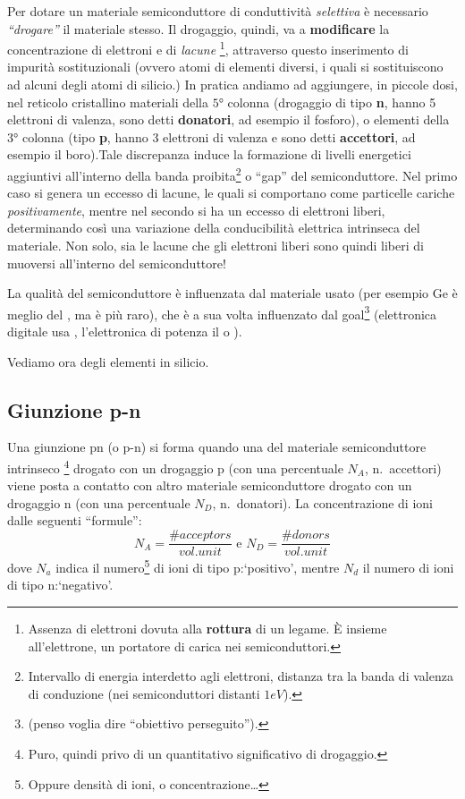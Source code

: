 \documentclass[
]{book}
\begin{document}
Per dotare un materiale semiconduttore di conduttività \emph{selettiva}
è necessario \emph{``drogare''} il materiale stesso. Il drogaggio,
quindi, va a \textbf{modificare} la concentrazione di elettroni e di
\emph{lacune} \footnote{Assenza di elettroni dovuta alla
  \textbf{rottura} di un legame. È insieme all'elettrone, un portatore
  di carica nei semiconduttori.}, attraverso questo inserimento di
impurità sostituzionali (ovvero atomi di elementi diversi, i quali si
sostituiscono ad alcuni degli atomi di silicio.) \newline In pratica
andiamo ad aggiungere, in piccole dosi, nel reticolo cristallino
materiali della \(5°\) colonna (drogaggio di tipo \textbf{n}, hanno 5
elettroni di valenza, sono detti \textbf{donatori}, ad esempio il
fosforo), o elementi della \(3°\) colonna (tipo \textbf{p}, hanno 3
elettroni di valenza e sono detti \textbf{accettori}, ad esempio il
boro).\newline Tale discrepanza induce la formazione di livelli
energetici aggiuntivi all'interno della banda proibita\footnote{Intervallo
  di energia interdetto agli elettroni, distanza tra la banda di valenza
  di conduzione (nei semiconduttori distanti \(1\si{eV}\)).} o ``gap''
del semiconduttore. Nel primo caso si genera un eccesso di lacune, le
quali si comportano come particelle cariche \emph{positivamente}, mentre
nel secondo si ha un eccesso di elettroni liberi, determinando così una
variazione della conducibilità elettrica intrinseca del materiale.
\newline Non solo, sia le lacune che gli elettroni liberi sono quindi
liberi di muoversi all'interno del semiconduttore!

La qualità del semiconduttore è influenzata dal materiale usato (per
esempio Ge è meglio del , ma è più raro), che è a sua volta
influenzato dal goal\footnote{(penso voglia dire ``obiettivo
  perseguito'').} (elettronica digitale usa , l'elettronica di
potenza il  o ).

Vediamo ora degli elementi in silicio.

\subsection{Giunzione p-n}\label{giunzione-p-n}

Una giunzione pn (o p-n) si forma quando una del materiale
semiconduttore intrinseco \footnote{Puro, quindi privo di un
  quantitativo significativo di drogaggio.} drogato con un drogaggio p
(con una percentuale \(N_{A}\), n.~accettori) viene posta a contatto con
altro materiale semiconduttore drogato con un drogaggio n (con una
percentuale \(N_{D}\), n.~donatori). \newline La concentrazione di ioni
dalle seguenti ``formule'': \[
N_A = \frac{\# acceptors}{vol. unit} \text{ e } N_D=\frac{\# donors}{vol. unit}
\] dove \(N_a\) indica il numero\footnote{Oppure densità di ioni, o
  concentrazione\ldots{}} di ioni di tipo p:`positivo', mentre \(N_d\)
il numero di ioni di tipo n:`negativo'.
\end{document}
